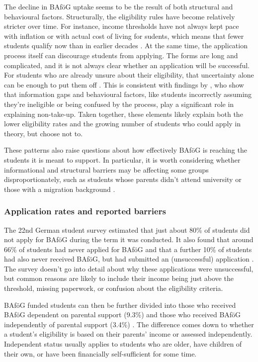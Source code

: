 The decline in BAföG uptake seems to be the result of both structural and behavioural factors. Structurally, the eligibility rules have become relatively stricter over time. For instance, income thresholds have not always kept pace with inflation or with actual cost of living for sudents, which means that fewer students qualify now than in earlier decades \citep{meier_bafog_2024}. At the same time, the application process itself can discourage students from applying. The forms are long and complicated, and it is not always clear whether an application will be successful. For students who are already unsure about their eligibility, that uncertainty alone can be enough to put them off \citep{kroher_studierendenbefragung_2023}. This is consistent with findings by \citep{fidan_why_2021}, who show that information gaps and behavioural factors, like students incorrectly assuming they’re ineligible or being confused by the process, play a significant role in explaining non-take-up. Taken together, these elements likely explain both the lower eligibility rates and the growing number of students who could apply in theory, but choose not to.

These patterns also raise questions about how effectively BAföG is reaching the students it is meant to support. In particular, it is worth considering whether informational and structural barriers may be affecting some groups disproportionately, such as students whose parents didn’t attend university or those with a migration background \citep{kroher_studierendenbefragung_2023}.

\subsubsection*{Application rates and reported barriers}
\label{subsection:application-rates-and-reported-barriers}

The 22nd German student survey estimated that just about 80\% of students did not apply for BAföG during the term it was conducted. It also found that around 66\% of students had never applied for BAföG and that a further 10\% of students had also never received BAföG, but had submitted an (unsuccessful) application \citep{kroher_studierendenbefragung_2023}. The survey doesn’t go into detail about why these applications were unsuccessful, but common reasons are likely to include their income being just above the threshold, missing paperwork, or confusion about the eligibility criteria. 

BAföG funded students can then be further divided into those who received BAföG dependent on parental support (9.3\%) and those who received BAföG independently of parental support (3.4\%) \citep{kroher_studierendenbefragung_2023}. The difference comes down to whether a student’s eligibility is based on their parents’ income or assessed independently. Independent status usually applies to students who are older, have children of their own, or have been financially self-sufficient for some time.

